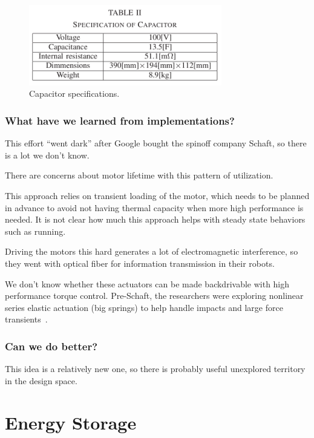 \documentclass[letterpaper,12pt,fullpage]{article}
\begin{document}
\begin{figure}[h]
\centering
\includegraphics[width=0.75\textwidth]{tech-figs/s2}
\caption{Capacitor specifications.}
\label{f:s2}
\end{figure}

\subsubsection{What have we learned from implementations?}

This effort ``went dark'' after Google bought the spinoff company
Schaft, so there is a lot we don't know.

There are concerns about motor lifetime with this pattern of utilization.

This approach relies on transient loading of the motor, which needs
to be planned in advance to avoid not having thermal capacity
when more high performance is needed.
It is not clear how much this approach helps with 
steady state behaviors such as running.

Driving the motors this hard generates a lot of electromagnetic interference,
so they went with optical fiber for information transmission in their
robots.

We don't know whether these actuators can be made backdrivable with
high performance torque control. Pre-Schaft, the researchers were exploring
nonlinear series elastic actuation (big springs)
to help handle impacts and large force
transients~\cite{IEEE06651562}.

\subsubsection{Can we do better?}

This idea is a relatively new one, so there is probably useful unexplored
territory in the design space.

\section{Energy Storage}
\end{document}
